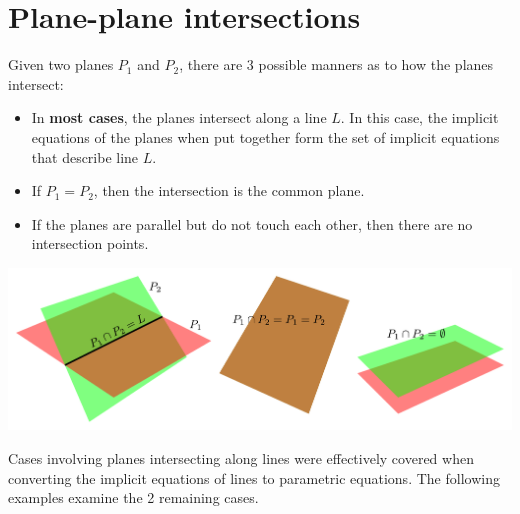 \documentclass{article}
\begin{document}
\section*{Plane-plane intersections}

Given two planes \(P_1\) and \(P_2\), there are \(3\) possible manners as to how the planes intersect:
\begin{itemize}
\item In {\bf most cases}, the planes intersect along a line \(L\). In this case, the implicit equations of the planes when put together form the set of implicit equations that describe line \(L\). 
\item If \(P_1 = P_2\), then the intersection is the common plane. 
\item If the planes are parallel but do not touch each other, then there are no intersection points.
\end{itemize} 

\includegraphics[width = \textwidth]{plane_plane_intersections}

Cases involving planes intersecting along lines were effectively covered when converting the implicit equations of lines to parametric equations. The following examples examine the 2 remaining cases.
\end{document}
